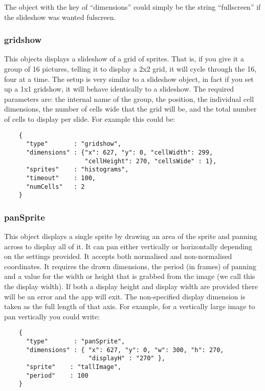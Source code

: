 \documentclass[a4paper]{article}
\begin{document}
  The object with the key of ``dimensions'' could simply be the string
  ``fullscreen'' if the slideshow was wanted fulscreen.

  \subsubsection{gridshow}
  This objects displays a slideshow of a grid of sprites. That is, if you
  give it a group of 16 pictures, telling it to display a 2x2 grid, it will
  cycle through the 16, four at a time. The setup is very similar to a
  slideshow object, in fact if you set up a 1x1 gridshow, it will behave
  identically to a slideshow.
  The required parameters are: the internal name of the group, the position,
  the individual cell dimensions, the number of cells wide that the grid
  will be, and the total number of cells to display per slide. For example
  this could be:

  \begin{verbatim}
    {
      "type"       : "gridshow",
      "dimensions" : {"x": 627, "y": 0, "cellWidth": 299, 
                      "cellHeight": 270, "cellsWide" : 1},
      "sprites"    : "histograms",
      "timeout"    : 100,
      "numCells"   : 2
    }  
  \end{verbatim}

  \subsubsection{panSprite}
  This object displays a single sprite by drawing an area of the sprite and
  panning across to display all of it. It can pan either vertically or
  horizontally depending on the settings provided. It accepts both
  normalised and non-normalised coordinates. It requires the drawn
  dimensions, the period (in frames) of panning and a value for the width
  or height that is grabbed from the image (we call this the display width).
  If both a display height and display width are provided there will be an
  error and the app will exit. The non-specified display dimension is taken
  as the full length of that axis. For example, for a vertically large image
  to pan vertically you could write:


  \begin{verbatim}
    {
      "type"       : "panSprite",
      "dimensions" : { "x": 627, "y": 0, "w": 300, "h": 270, 
                       "displayH" : "270" },
      "sprite"    : "tallImage",
      "period"    : 100
    }  
  \end{verbatim}
\end{document}
